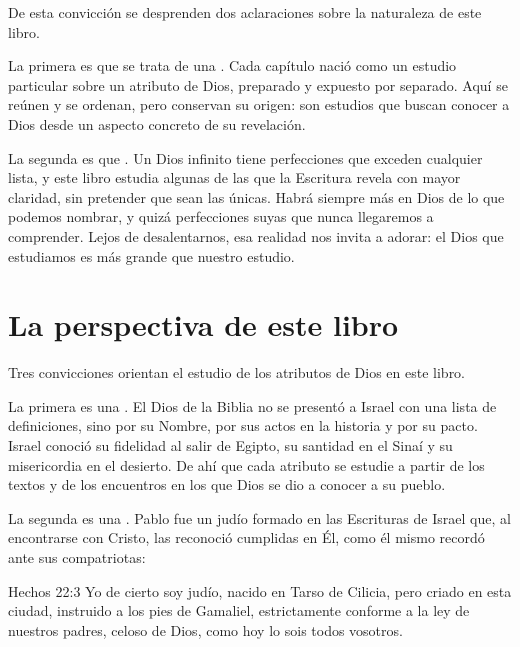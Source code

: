 De esta convicción se desprenden dos aclaraciones sobre la naturaleza de este libro.

La primera es que se trata de una . Cada capítulo nació como un estudio particular sobre un atributo de Dios, preparado y expuesto por separado. Aquí se reúnen y se ordenan, pero conservan su origen: son estudios que buscan conocer a Dios desde un aspecto concreto de su revelación.

La segunda es que . Un Dios infinito tiene perfecciones que exceden cualquier lista, y este libro estudia algunas de las que la Escritura revela con mayor claridad, sin pretender que sean las únicas. Habrá siempre más en Dios de lo que podemos nombrar, y quizá perfecciones suyas que nunca llegaremos a comprender. Lejos de desalentarnos, esa realidad nos invita a adorar: el Dios que estudiamos es más grande que nuestro estudio.


\section{La perspectiva de este libro}

Tres convicciones orientan el estudio de los atributos de Dios en este libro.

La primera es una . El Dios de la Biblia no se presentó a Israel con una lista de definiciones, sino por su Nombre, por sus actos en la historia y por su pacto. Israel conoció su fidelidad al salir de Egipto, su santidad en el Sinaí y su misericordia en el desierto. De ahí que cada atributo se estudie a partir de los textos y de los encuentros en los que Dios se dio a conocer a su pueblo.

La segunda es una . Pablo fue un judío formado en las Escrituras de Israel que, al encontrarse con Cristo, las reconoció cumplidas en Él, como él mismo recordó ante sus compatriotas:

\begin{verso}{Hechos 22:3}
Yo de cierto soy judío, nacido en Tarso de Cilicia, pero criado en esta ciudad, instruido a los pies de Gamaliel, estrictamente conforme a la ley de nuestros padres, celoso de Dios, como hoy lo sois todos vosotros.
\end{verso}

